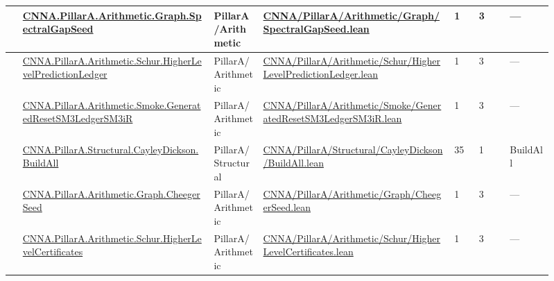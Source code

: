 \begin{longtable}{L{0.025\linewidth} L{0.315\linewidth} L{0.08\linewidth} L{0.315\linewidth} L{0.045\linewidth} L{0.055\linewidth} L{0.07\linewidth}}
\hline
{} & \href{run:repo_snapshot/CNNA/PillarA/Arithmetic/Graph/SpectralGapSeed.lean}{CNNA.\allowbreak{}PillarA.\allowbreak{}Arithmetic.\allowbreak{}Graph.\allowbreak{}SpectralGapSeed} & PillarA/\allowbreak{}Arithmetic & \href{run:repo_snapshot/CNNA/PillarA/Arithmetic/Graph/SpectralGapSeed.lean}{CNNA/\allowbreak{}PillarA/\allowbreak{}Arithmetic/\allowbreak{}Graph/\allowbreak{}SpectralGapSeed.\allowbreak{}lean} & 1 & 3 & ---\\
\hline
{} & \href{run:repo_snapshot/CNNA/PillarA/Arithmetic/Schur/HigherLevelPredictionLedger.lean}{CNNA.\allowbreak{}PillarA.\allowbreak{}Arithmetic.\allowbreak{}Schur.\allowbreak{}HigherLevelPredictionLedger} & PillarA/\allowbreak{}Arithmetic & \href{run:repo_snapshot/CNNA/PillarA/Arithmetic/Schur/HigherLevelPredictionLedger.lean}{CNNA/\allowbreak{}PillarA/\allowbreak{}Arithmetic/\allowbreak{}Schur/\allowbreak{}HigherLevelPredictionLedger.\allowbreak{}lean} & 1 & 3 & ---\\
\hline
{} & \href{run:repo_snapshot/CNNA/PillarA/Arithmetic/Smoke/GeneratedResetSM3LedgerSM3iR.lean}{CNNA.\allowbreak{}PillarA.\allowbreak{}Arithmetic.\allowbreak{}Smoke.\allowbreak{}GeneratedResetSM3LedgerSM3iR} & PillarA/\allowbreak{}Arithmetic & \href{run:repo_snapshot/CNNA/PillarA/Arithmetic/Smoke/GeneratedResetSM3LedgerSM3iR.lean}{CNNA/\allowbreak{}PillarA/\allowbreak{}Arithmetic/\allowbreak{}Smoke/\allowbreak{}GeneratedResetSM3LedgerSM3iR.\allowbreak{}lean} & 1 & 3 & ---\\
\hline
{} & \href{run:repo_snapshot/CNNA/PillarA/Structural/CayleyDickson/BuildAll.lean}{CNNA.\allowbreak{}PillarA.\allowbreak{}Structural.\allowbreak{}CayleyDickson.\allowbreak{}BuildAll} & PillarA/\allowbreak{}Structural & \href{run:repo_snapshot/CNNA/PillarA/Structural/CayleyDickson/BuildAll.lean}{CNNA/\allowbreak{}PillarA/\allowbreak{}Structural/\allowbreak{}CayleyDickson/\allowbreak{}BuildAll.\allowbreak{}lean} & 35 & 1 & BuildAll\\
\hline
{} & \href{run:repo_snapshot/CNNA/PillarA/Arithmetic/Graph/CheegerSeed.lean}{CNNA.\allowbreak{}PillarA.\allowbreak{}Arithmetic.\allowbreak{}Graph.\allowbreak{}CheegerSeed} & PillarA/\allowbreak{}Arithmetic & \href{run:repo_snapshot/CNNA/PillarA/Arithmetic/Graph/CheegerSeed.lean}{CNNA/\allowbreak{}PillarA/\allowbreak{}Arithmetic/\allowbreak{}Graph/\allowbreak{}CheegerSeed.\allowbreak{}lean} & 1 & 3 & ---\\
\hline
{} & \href{run:repo_snapshot/CNNA/PillarA/Arithmetic/Schur/HigherLevelCertificates.lean}{CNNA.\allowbreak{}PillarA.\allowbreak{}Arithmetic.\allowbreak{}Schur.\allowbreak{}HigherLevelCertificates} & PillarA/\allowbreak{}Arithmetic & \href{run:repo_snapshot/CNNA/PillarA/Arithmetic/Schur/HigherLevelCertificates.lean}{CNNA/\allowbreak{}PillarA/\allowbreak{}Arithmetic/\allowbreak{}Schur/\allowbreak{}HigherLevelCertificates.\allowbreak{}lean} & 1 & 3 & ---\\

\end{longtable}
